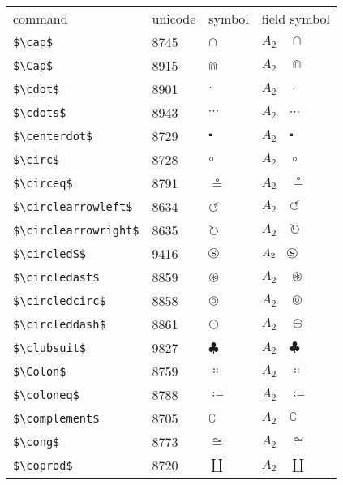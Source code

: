 \documentclass{article}
\begin{document}
\begin{table}
\begin{center}
\begin{tabular}{llll}
 command                    &unicode & symbol                & field symbol\\
 \verb#$\cap$#                & 8745 & $\cap$                & $A_2\quad \cap$\\
 \verb#$\Cap$#                & 8915 & $\Cap$                & $A_2\quad \Cap$\\
 \verb#$\cdot$#               & 8901 & $\cdot$               & $A_2\quad \cdot$\\
 \verb#$\cdots$#              & 8943 & $\cdots$              & $A_2\quad \cdots$\\
 \verb#$\centerdot$#          & 8729 & $\centerdot$          & $A_2\quad \centerdot$\\
 \verb#$\circ$#               & 8728 & $\circ$               & $A_2\quad \circ$\\
 \verb#$\circeq$#             & 8791 & $\circeq$             & $A_2\quad \circeq$\\
 \verb#$\circlearrowleft$#    & 8634 & $\circlearrowleft$    & $A_2\quad \circlearrowleft$\\
 \verb#$\circlearrowright$#   & 8635 & $\circlearrowright$   & $A_2\quad \circlearrowright$\\
 \verb#$\circledS$#           & 9416 & $\circledS$           & $A_2\quad \circledS$\\
 \verb#$\circledast$#         & 8859 & $\circledast$         & $A_2\quad \circledast$\\
 \verb#$\circledcirc$#        & 8858 & $\circledcirc$        & $A_2\quad \circledcirc$\\
 \verb#$\circleddash$#        & 8861 & $\circleddash$        & $A_2\quad \circleddash$\\
 \verb#$\clubsuit$#           & 9827 & $\clubsuit$           & $A_2\quad \clubsuit$\\
 \verb#$\Colon$#              & 8759 & $\Colon$              & $A_2\quad \Colon$\\
 \verb#$\coloneq$#            & 8788 & $\coloneq$            & $A_2\quad \coloneq$\\
 \verb#$\complement$#         & 8705 & $\complement$         & $A_2\quad \complement$\\
 \verb#$\cong$#               & 8773 & $\cong$               & $A_2\quad \cong$\\
 \verb#$\coprod$#             & 8720 & $\coprod$             & $A_2\quad \coprod$\\

\end{tabular}
\end{center}
\end{table}
\end{document}
